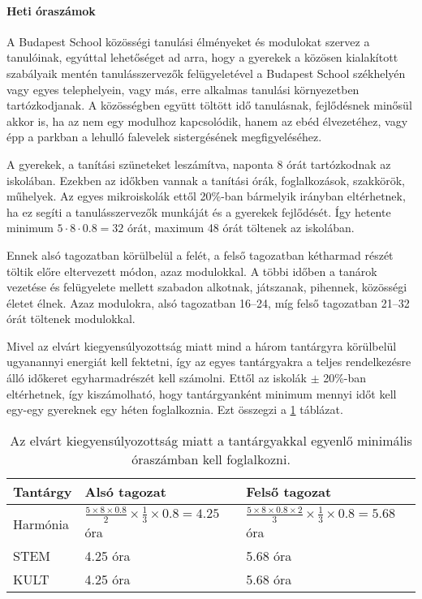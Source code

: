 \paragraph{Heti óraszámok}

A Budapest School közösségi tanulási élményeket és modulokat szervez a tanulóinak, egyúttal lehetőséget ad arra, hogy a gyerekek a közösen kialakított szabályaik mentén tanulásszervezők felügyeletével a Budapest School székhelyén vagy egyes telephelyein, vagy más, erre alkalmas tanulási környezetben tartózkodjanak. A közösségben együtt töltött idő tanulásnak, fejlődésnek minősül akkor is, ha az nem egy modulhoz kapcsolódik, hanem az ebéd élvezetéhez, vagy épp a parkban a lehulló falevelek sistergésének megfigyeléséhez.

A gyerekek, a tanítási szüneteket leszámítva, naponta 8 órát tartózkodnak az iskolában. Ezekben az időkben vannak a tanítási órák, foglalkozások, szakkörök, műhelyek. Az egyes mikroiskolák ettől 20\%-ban bármelyik irányban eltérhetnek, ha ez segíti a tanulásszervezők munkáját és a gyerekek fejlődését. Így hetente minimum $5 \cdot 8 \cdot 0.8 = 32$ órát, maximum 48 órát töltenek az iskolában.

Ennek alsó tagozatban körülbelül a felét, a felső tagozatban kétharmad részét töltik előre eltervezett módon, azaz modulokkal. A többi időben a tanárok vezetése és felügyelete mellett szabadon alkotnak, játszanak, pihennek, közösségi életet élnek. Azaz modulokra, alsó tagozatban 16--24, míg felső tagozatban 21--32 órát töltenek modulokkal.

Mivel az elvárt kiegyensúlyozottság miatt mind a három tantárgyra körülbelül ugyanannyi energiát kell fektetni, így az egyes tantárgyakra a teljes rendelkezésre álló időkeret egyharmadrészét kell számolni. Ettől az iskolák $\pm$ 20\%-ban eltérhetnek, így kiszámolható, hogy tantárgyanként minimum mennyi időt kell egy-egy gyereknek egy héten foglalkoznia. Ezt összegzi a \ref{tbl:oraszamok} táblázat.


			\begin{table}

				\begin{tabular}{ l|l|l }

					\textbf{Tantárgy} & \textbf{Alsó tagozat} & \textbf{Felső tagozat}\\ \hline
Harmónia & $\frac{5 \times 8 \times 0.8}{2} \times \frac{1}{3} \times 0.8 = 4.25$ óra &
$\frac{5 \times 8 \times 0.8 \times 2}{3} \times \frac{1}{3} \times 0.8 = 5.68$   óra\\ \hline
STEM & 4.25 óra &  5.68 óra\\ \hline
KULT  & 4.25 óra & 5.68 óra\\ \hline

				\end{tabular}
        \caption{Az elvárt kiegyensúlyozottság miatt a tantárgyakkal egyenlő minimális óraszámban kell foglalkozni.}
        \label{tbl:oraszamok}
			\end{table}


